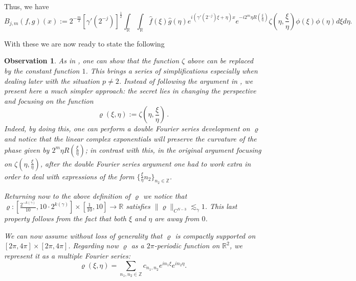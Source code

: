 \documentclass{amsart}
\newcommand{\R}{\mathbb{R}}
\newcommand{\Z}{\mathbb{Z}}
\newtheorem{observation}[theorem]{Observation}
\theoremstyle{definition}
\theoremstyle{remark}
\numberwithin{equation}{section}
\begin{document}
Thus, we have
\begin{equation}\label{bjxm}
B_{j,m}(f,g)(x):=2^{-\frac{m}{2}}[\gamma'(2^{-j})]^\frac{1}{2} \int_\R
\int_\R \hat{f}(\xi)\hat{g}(\eta)e^{i(\gamma'(2^{-j})\xi+\eta)x}e^{-i 2^m \eta
R(\frac{\xi}{\eta})}\zeta(\eta,\frac{\xi}{\eta}
)\phi(\xi)\phi(\eta)d\xi d\eta.
\end{equation}


With these we are now ready to state the following

\begin{observation}
As in \cite[Section 5]{lie2015boundedness}, one can show that the function
$\zeta$ above can be replaced by the constant function $1$. This brings a series of simplifications especially when dealing later with the situation $p\not=2$. Instead of following the argument in  \cite[Section 5]{lie2015boundedness}, we present here a much simpler approach: the secret lies in changing the perspective and focusing on the function
\[
\varrho(\xi,\eta):=\zeta(\eta,\frac{\xi}{\eta})\,.
\]
Indeed, by doing this, one can perform a double Fourier series development on $\varrho$ and notice that the linear complex exponentials will preserve the curvature of the phase given by $2^m\eta R(\frac{\xi}{\eta})$; in contrast with this, in the original argument focusing on $\zeta(\eta,\frac{\xi}{\eta})$, after the double Fourier series argument one had to work extra in order to deal with expressions of the form $\{\frac{\xi}{\eta}n_2\}_{n_2\in\Z}$.

Returning now to the above definition of $ \varrho$ we notice that $\varrho:[\frac{2^{-k(\gamma)}}{10},10\cdot 2^{k(\gamma)}]
\times[\frac{1}{10},10] \to\R$ satisfies $\|\varrho\|_{C^{N-3}}\lesssim_\gamma
1$. This last property follows from the fact that both $\xi$
and $\eta$ are away from $0$.

We can now assume without loss of generality that $\varrho$ is compactly supported on $[2\pi,4\pi]\times[2\pi,4\pi]$. Regarding now $\varrho$ as a $2\pi$-periodic function on $\R^2$, we represent it as a multiple Fourier series:
\[
\varrho(\xi,\eta)=\sum_{n_1,n_2\in\Z}c_{n_1,n_2}e^{i n_1 \xi}e^{i n_2 \eta}.
\]


\end{observation}
\end{document}
